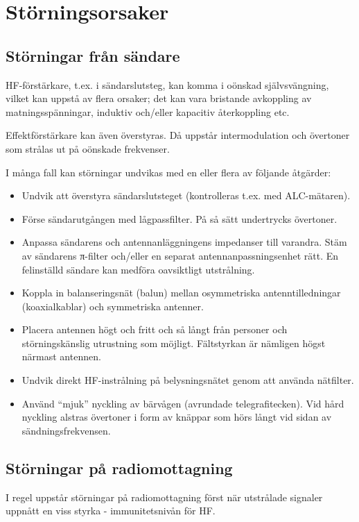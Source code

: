 \section{Störningsorsaker}

\subsection{Störningar från sändare}

HF-förstärkare, t.ex. i sändarslutsteg, kan komma i oönskad
självsvängning, vilket kan uppstå av flera orsaker; det kan vara
bristande avkoppling av matningsspänningar, induktiv och/eller
kapacitiv återkoppling etc.

Effektförstärkare kan även överstyras.  Då uppstår intermodulation och
övertoner som strålas ut på oönskade frekvenser.

I många fall kan störningar undvikas med en eller flera av följande
åtgärder:
\begin{itemize}
\item Undvik att överstyra sändarslutsteget (kontrolleras t.ex. med
  ALC-mätaren).
\item Förse sändarutgången med lågpassfilter.  På så sätt undertrycks
  övertoner.
\item Anpassa sändarens och antennanläggningens impedanser till
  varandra. Stäm av sändarens π-filter och/eller en separat
  antennanpassningsenhet rätt. En felinställd sändare kan medföra
  oavsiktligt utstrålning.
\item Koppla in balanseringsnät (balun) mellan osymmetriska
  antenntilledningar (koaxialkablar) och symmetriska antenner.
\item Placera antennen högt och fritt och så långt från personer och
  störningskänslig utrustning som möjligt. Fältstyrkan är nämligen
  högst närmast antennen.
\item Undvik direkt HF-instrålning på belysningsnätet genom att
  använda nätfilter.
\item Använd ``mjuk'' nyckling av bärvågen (avrundade
  telegrafitecken). Vid hård nyckling alstras övertoner i form av
  knäppar som hörs långt vid sidan av sändningsfrekvensen.
\end{itemize}

\subsection{Störningar på radiomottagning}

I regel uppstår störningar på radiomottagning först när utstrålade
signaler uppnått en viss styrka - immunitetsnivån för HF.

